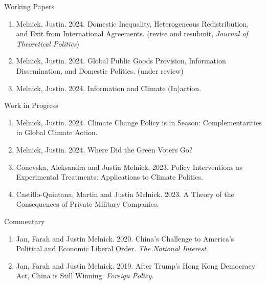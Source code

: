 \documentclass{resume} %
\begin{document}
\begin{rSection}{Working Papers}

\begin{enumerate}
            \item Melnick, Justin. 2024. Domestic Inequality, Heterogeneous Redistribution, and Exit from International Agreements. (revise and resubmit, \textit{Journal of Theoretical Politics})
                \item Melnick, Justin. 2024. Global Public Goods Provision, Information Dissemination, and Domestic Politics. (under review)
                    \item Melnick, Justin. 2024. Information and Climate (In)action.
\end{enumerate}

\end{rSection}

\begin{rSection}{Work in Progress}

\begin{enumerate}
\item Melnick, Justin. 2024. Climate Change Policy is in Season: Complementarities in Global Climate Action.
    \item Melnick, Justin. 2024. Where Did the Green Voters Go?
    \item Conevska, Aleksandra and Justin Melnick. 2023. Policy Interventions as Experimental Treatments: Applications to Climate Politics.
    \item Castillo-Quintana, Martin and Justin Melnick. 2023. A Theory of the Consequences of Private Military Companies.
\end{enumerate}

\end{rSection}

\begin{rSection}{Commentary}
    \begin{enumerate}
    \item   Jan, Farah and Justin Melnick. 2020. China's Challenge to America's Political and Economic Liberal Order. \textit{The National Interest}.
    \item    Jan, Farah and Justin Melnick. 2019. After Trump's Hong Kong Democracy Act, China is Still Winning. \textit{Foreign Policy}.
\end{enumerate}
\end{rSection}

\newpage
\end{document}
